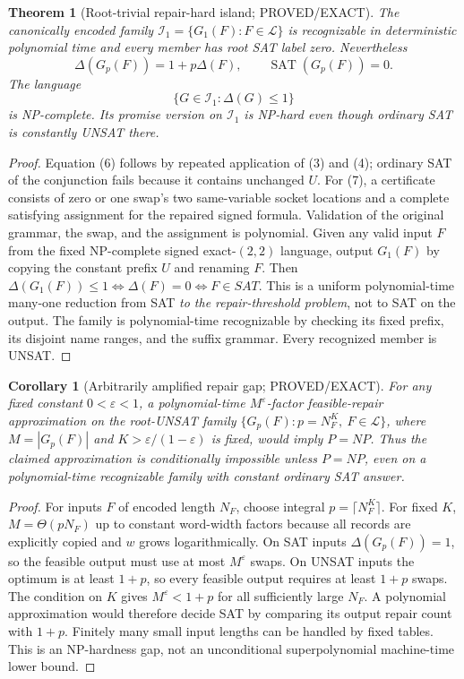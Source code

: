 \documentclass[11pt]{article}
\newtheorem{theorem}{Theorem}
\newtheorem{corollary}{Corollary}
\begin{document}
\begin{theorem}[Root-trivial repair-hard island; PROVED/EXACT]
The canonically encoded family
\(\mathcal I_1=\{G_1(F):F\in\mathcal L\}\)
is recognizable in deterministic polynomial time and every member has root SAT label zero. Nevertheless
\[
\boxed{\Delta(G_p(F))=1+p\Delta(F),\qquad
\operatorname{SAT}(G_p(F))=0.}\tag{6}
\]
The language
\[
\boxed{\{G\in\mathcal I_1:\Delta(G)\le1\}}
\tag{7}
\]
is NP-complete. Its promise version on \(\mathcal I_1\) is NP-hard even though ordinary SAT is constantly UNSAT there.
\end{theorem}
\begin{proof}
Equation (6) follows by repeated application of (3) and (4); ordinary SAT of the conjunction fails because it contains unchanged \(U\).
For (7), a certificate consists of zero or one swap's two same-variable socket locations and a complete satisfying assignment for the repaired signed formula. Validation of the original grammar, the swap, and the assignment is polynomial. Given any valid input \(F\) from the fixed NP-complete signed exact-\((2,2)\) language, output \(G_1(F)\) by copying the constant prefix \(U\) and renaming \(F\). Then \(\Delta(G_1(F))\le1\iff\Delta(F)=0\iff F\in SAT\). This is a uniform polynomial-time many-one reduction from SAT \emph{to the repair-threshold problem}, not to SAT on the output. The family is polynomial-time recognizable by checking its fixed prefix, its disjoint name ranges, and the suffix grammar. Every recognized member is UNSAT.
\end{proof}
\begin{corollary}[Arbitrarily amplified repair gap; PROVED/EXACT]
For any fixed constant \(0<\varepsilon<1\), a polynomial-time \(M^\varepsilon\)-factor feasible-repair approximation on the root-UNSAT family \(\{G_p(F):p=N_F^K,\ F\in\mathcal L\}\), where \(M=|G_p(F)|\) and \(K>\varepsilon/(1-\varepsilon)\) is fixed, would imply \(P=NP\). Thus the claimed approximation is conditionally impossible unless \(P=NP\), even on a polynomial-time recognizable family with constant ordinary SAT answer.
\end{corollary}
\begin{proof}
For inputs \(F\) of encoded length \(N_F\), choose integral \(p=\lceil N_F^K\rceil\). For fixed \(K\), \(M=\Theta(pN_F)\) up to constant word-width factors because all records are explicitly copied and \(w\) grows logarithmically. On SAT inputs \(\Delta(G_p(F))=1\), so the feasible output must use at most \(M^\varepsilon\) swaps. On UNSAT inputs the optimum is at least \(1+p\), so every feasible output requires at least \(1+p\) swaps. The condition on \(K\) gives \(M^\varepsilon<1+p\) for all sufficiently large \(N_F\). A polynomial approximation would therefore decide SAT by comparing its output repair count with \(1+p\). Finitely many small input lengths can be handled by fixed tables. This is an NP-hardness gap, not an unconditional superpolynomial machine-time lower bound.
\end{proof}
\end{document}
